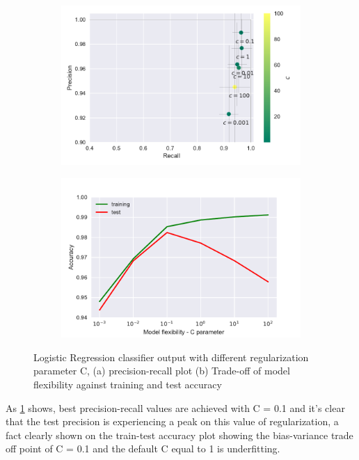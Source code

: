 \documentclass[12pt, a4paper]{scrartcl}
\begin{document}
\begin{figure}[h]
    \centering
    \begin{subfigure}{0.45\textwidth}
        \includegraphics[width=\textwidth]{logistic_regression}
        \caption{}
        \label{fig:logistic_regression}
    \end{subfigure}
    \begin{subfigure}{0.45\textwidth}
        \includegraphics[width=\textwidth]{tradeoff_lr}
        \caption{}
        \label{fig:tradeoff_lr}
    \end{subfigure}
    \caption{Logistic Regression classifier output with different regularization parameter C, (a) precision-recall plot (b) Trade-off of model flexibility against training and test accuracy}\label{fig:LR}
\end{figure}


As \cref{fig:logistic_regression} shows, best precision-recall values are achieved with C = 0.1 and it's clear that the test precision is experiencing a peak on this value of regularization, a fact clearly shown on the train-test accuracy plot showing the bias-variance trade off point of C = 0.1 and the default C equal to 1 is underfitting. 
\end{document}
